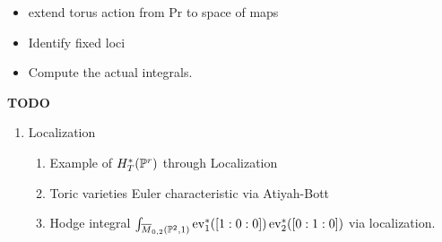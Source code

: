\documentclass[12pt]{memoir}
\begin{document}
\begin{itemize}
    \item extend torus action from Pr to space of maps
    \item Identify fixed loci 
    \item Compute the actual integrals.
\end{itemize}

\textbf{TODO}
\begin{enumerate}
\item Localization
\begin{enumerate}
    \item Example of $H^\ast_T(\mathbb{P}^r)$ through Localization
    \item Toric varieties Euler characteristic via Atiyah-Bott
    \item Hodge integral $\int_{\overline M_{0,2}(\mathbb{P}^2,1)}\operatorname{ev}_1^\ast([1:0:0])\operatorname{ev}_2^\ast([0:1:0])$ via localization.
\end{enumerate}
\end{enumerate}
\ifx\nextra\undefined
\printindex
\else\fi
\nocite{*}


\end{document}
